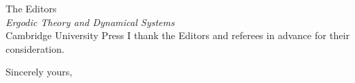 \documentclass[11pt,a4paper]{letter}
\begin{document}
\begin{letter}{
The Editors \\
\emph{Ergodic Theory and Dynamical Systems} \\
Cambridge University Press
}
I thank the Editors and referees in advance for their consideration.

\closing{Sincerely yours,}

\end{letter}
\end{document}
